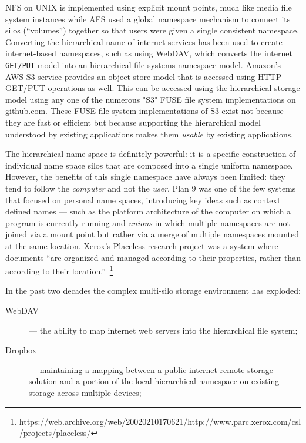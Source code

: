 NFS on UNIX is implemented using explicit mount points, much like media file
system instances while AFS used a global namespace mechanism to connect its
silos (``volumes'') together so that users were given a single consistent
namespace. Converting the hierarchical name of internet services has been used
to create internet-based namespaces, such as using \ac{WebDAV}, which converts
the internet \texttt{GET/PUT} model into an
hierarchical file systems namespace model.  Amazon's AWS S3 service provides an
object store model that is accessed using HTTP GET/PUT operations as well. This
can be accessed using the hierarchical storage model using any one of the
numerous "S3" FUSE file system implementations on \url{github.com}.  These FUSE
file system implementations of S3 exist not because they are fast or efficient
but because supporting the hierarchical model understood by existing
applications makes them \emph{usable} by existing applications.

The hierarchical name space is definitely powerful: it is a specific
construction of individual name space silos that are composed into a single
uniform namespace. However, the benefits of this single namespace have always
been limited: they tend to follow the \emph{computer} and not the \emph{user}.
Plan 9 was one of the few systems that focused on personal name spaces,
introducing key ideas such as context defined names --- such as the platform
architecture of the computer on which a program is currently running and
\emph{unions} in which multiple namespaces are not joined via a mount point but
rather via a merge of multiple namespaces mounted at the same location.
Xerox's Placeless research project was a system where documents ``are organized
and managed according to their properties, rather than according to their
location.''~\footnote{https://web.archive.org/web/20020210170621/http://www.parc.xerox.com/csl/projects/placeless/}

In the past two decades the complex multi-silo storage environment has exploded:
\begin{description}
    \item[WebDAV] --- the ability to map internet web servers into the
        hierarchical file system;
    \item[Dropbox] --- maintaining a mapping between a public internet remote
        storage solution and a portion of the local hierarchical namespace on
        existing storage across multiple devices;

\end{description}


